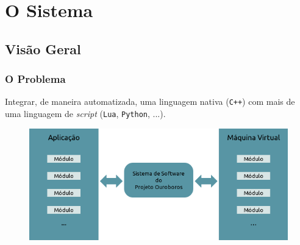 \documentclass[brazil]{beamer}
\begin{document}
\section{O Sistema}
\subsection{Visão Geral}
\begin{frame}[fragile]
  \frametitle{O Problema}
  \pause
  \begin{block}{}
    Integrar, de maneira automatizada, uma linguagem nativa (\texttt{C++}) com
    mais de uma linguagem de \textit{script} (\texttt{Lua}, \texttt{Python}, ...).
  \end{block}
  \pause
  \begin{figure}
    \includegraphics[width=.7\textwidth]{images/overview-simple.png}
  \end{figure}
\end{frame}
\end{document}
